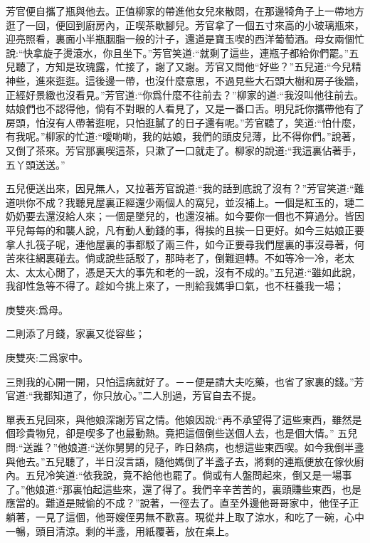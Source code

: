 \begin{parag}
    芳官便自攜了瓶與他去。正值柳家的帶進他女兒來散悶，在那邊犄角子上一帶地方逛了一回，便回到廚房內，正喫茶歇腳兒。芳官拿了一個五寸來高的小玻璃瓶來，迎亮照看，裏面小半瓶胭脂一般的汁子，還道是寶玉喫的西洋葡萄酒。母女兩個忙說:“快拿旋子燙滾水，你且坐下。”芳官笑道:“就剩了這些，連瓶子都給你們罷。”五兒聽了，方知是玫瑰露，忙接了，謝了又謝。芳官又問他“好些？”五兒道:“今兒精神些，進來逛逛。這後邊一帶，也沒什麼意思，不過見些大石頭大樹和房子後牆，正經好景緻也沒看見。”芳官道:“你爲什麼不往前去？”柳家的道:“我沒叫他往前去。姑娘們也不認得他，倘有不對眼的人看見了，又是一番口舌。明兒託你攜帶他有了房頭，怕沒有人帶著逛呢，只怕逛膩了的日子還有呢。”芳官聽了，笑道:“怕什麼，有我呢。”柳家的忙道:“噯喲喲，我的姑娘，我們的頭皮兒薄，比不得你們。”說著，又倒了茶來。芳官那裏喫這茶，只漱了一口就走了。柳家的說道:“我這裏佔著手，五丫頭送送。”
\end{parag}


\begin{parag}
    五兒便送出來，因見無人，又拉著芳官說道:“我的話到底說了沒有？”芳官笑道:“難道哄你不成？我聽見屋裏正經還少兩個人的窩兒，並沒補上。一個是紅玉的，璉二奶奶要去還沒給人來；一個是墜兒的，也還沒補。如今要你一個也不算過分。皆因平兒每每的和襲人說，凡有動人動錢的事，得挨的且挨一日更好。如今三姑娘正要拿人扎筏子呢，連他屋裏的事都駁了兩三件，如今正要尋我們屋裏的事沒尋著，何苦來往網裏碰去。倘或說些話駁了，那時老了，倒難迴轉。不如等冷一冷，老太太、太太心閒了，憑是天大的事先和老的一說，沒有不成的。”五兒道:“雖如此說，我卻性急等不得了。趁如今挑上來了，一則給我媽爭口氣，也不枉養我一場；\begin{note}庚雙夾:爲母。\end{note}二則添了月錢，家裏又從容些；\begin{note}庚雙夾:二爲家中。\end{note}三則我的心開一開，只怕這病就好了。－－便是請大夫吃藥，也省了家裏的錢。”芳官道:“我都知道了，你只放心。”二人別過，芳官自去不提。
\end{parag}


\begin{parag}
    單表五兒回來，與他娘深謝芳官之情。他娘因說:“再不承望得了這些東西，雖然是個珍貴物兒，卻是喫多了也最動熱。竟把這個倒些送個人去，也是個大情。” 五兒問:“送誰？”他娘道:“送你舅舅的兒子，昨日熱病，也想這些東西喫。如今我倒半盞與他去。”五兒聽了，半日沒言語，隨他媽倒了半盞子去，將剩的連瓶便放在傢伙廚內。五兒冷笑道:“依我說，竟不給他也罷了。倘或有人盤問起來，倒又是一場事了。”他娘道:“那裏怕起這些來，還了得了。我們辛辛苦苦的，裏頭賺些東西，也是應當的。難道是賊偷的不成？”說著，一徑去了。直至外邊他哥哥家中，他侄子正躺著，一見了這個，他哥嫂侄男無不歡喜。現從井上取了涼水，和吃了一碗，心中一暢，頭目清涼。剩的半盞，用紙覆著，放在桌上。
\end{parag}


